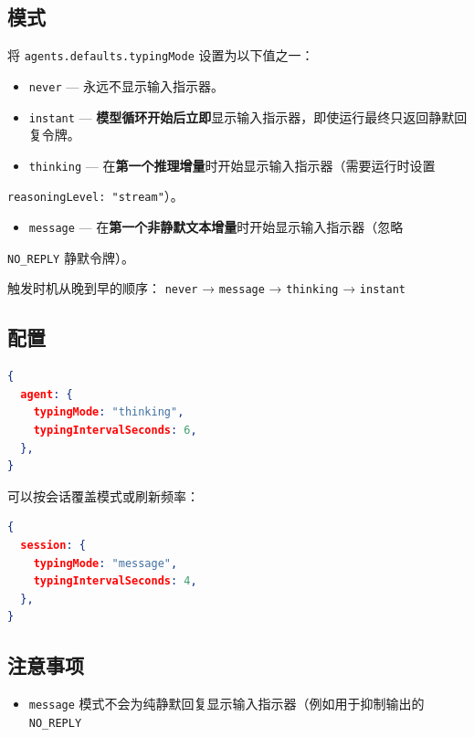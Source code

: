 \subsection{模式}


将 \texttt{agents.defaults.typingMode} 设置为以下值之一：

\begin{itemize}
  \item \texttt{never} — 永远不显示输入指示器。
  \item \texttt{instant} — \textbf{模型循环开始后立即}显示输入指示器，即使运行最终只返回静默回复令牌。
  \item \texttt{thinking} — 在\textbf{第一个推理增量}时开始显示输入指示器（需要运行时设置
\end{itemize}

\texttt{reasoningLevel: "stream"}）。
\begin{itemize}
  \item \texttt{message} — 在\textbf{第一个非静默文本增量}时开始显示输入指示器（忽略
\end{itemize}

\texttt{NO\_REPLY} 静默令牌）。

触发时机从晚到早的顺序：
\texttt{never} → \texttt{message} → \texttt{thinking} → \texttt{instant}

\subsection{配置}


\begin{lstlisting}[language=json]
{
  agent: {
    typingMode: "thinking",
    typingIntervalSeconds: 6,
  },
}
\end{lstlisting}


可以按会话覆盖模式或刷新频率：

\begin{lstlisting}[language=json]
{
  session: {
    typingMode: "message",
    typingIntervalSeconds: 4,
  },
}
\end{lstlisting}


\subsection{注意事项}


\begin{itemize}
  \item \texttt{message} 模式不会为纯静默回复显示输入指示器（例如用于抑制输出的 \texttt{NO\_REPLY}
\end{itemize}

